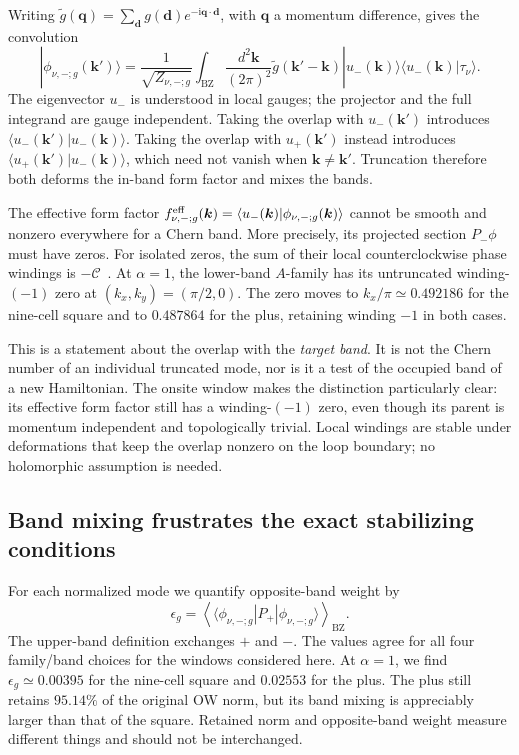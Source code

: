 \documentclass[aps,prb,onecolumn,nofootinbib,superscriptaddress]{revtex4-2}
\newcommand{\bk}{\boldsymbol{k}}
\newcommand{\bd}{\boldsymbol{d}}
\newcommand{\bq}{\boldsymbol{q}}
\newcommand{\ii}{\mathrm{i}}
\newcommand{\BZ}{\mathrm{BZ}}
\newcommand{\Chern}{\mathcal{C}}
\newcommand{\avg}[1]{\left\langle #1\right\rangle_{\BZ}}
\begin{document}
Writing $\widetilde g(\bq)=\sum_{\bd}g(\bd)e^{-\ii\bq\cdot\bd}$, with $\bq$ a momentum difference, gives the convolution
\begin{equation}
 |\phi_{\nu,-;g}(\bk')\rangle
 =\frac{1}{\sqrt{Z_{\nu,-;g}}}\int_{\BZ}\frac{d^2\bk}{(2\pi)^2}
 \widetilde g(\bk'-\bk)|u_-(\bk)\rangle\langle u_-(\bk)|\tau_\nu\rangle.
 \label{eq:convolution}
\end{equation}
The eigenvector $u_-$ is understood in local gauges; the projector and the full integrand are gauge independent. Taking the overlap with $u_-(\bk')$ introduces $\langle u_-(\bk')|u_-(\bk)\rangle$. Taking the overlap with $u_+(\bk')$ instead introduces $\langle u_+(\bk')|u_-(\bk)\rangle$, which need not vanish when $\bk\ne\bk'$. Truncation therefore both deforms the in-band form factor and mixes the bands.

The effective form factor $f^{\rm eff}_{\nu,-;g}(\bk)=\langle u_-(\bk)|\phi_{\nu,-;g}(\bk)\rangle$ cannot be smooth and nonzero everywhere for a Chern band. More precisely, its projected section $P_-\phi$ must have zeros. For isolated zeros, the sum of their local counterclockwise phase windings is $-\Chern$~\cite{BPJ}. At $\alpha=1$, the lower-band $A$-family has its untruncated winding-$(-1)$ zero at $(k_x,k_y)=(\pi/2,0)$. The zero moves to $k_x/\pi\simeq0.492186$ for the nine-cell square and to $0.487864$ for the plus, retaining winding $-1$ in both cases.

This is a statement about the overlap with the \emph{target band}. It is not the Chern number of an individual truncated mode, nor is it a test of the occupied band of a new Hamiltonian. The onsite window makes the distinction particularly clear: its effective form factor still has a winding-$(-1)$ zero, even though its parent is momentum independent and topologically trivial. Local windings are stable under deformations that keep the overlap nonzero on the loop boundary; no holomorphic assumption is needed.

\subsection{Band mixing frustrates the exact stabilizing conditions}

For each normalized mode we quantify opposite-band weight by
\begin{equation}
 \epsilon_g=\avg{\langle\phi_{\nu,-;g}|P_+|\phi_{\nu,-;g}\rangle}.
 \label{eq:leakage}
\end{equation}
The upper-band definition exchanges $+$ and $-$. The values agree for all four family/band choices for the windows considered here. At $\alpha=1$, we find $\epsilon_g\simeq0.00395$ for the nine-cell square and $0.02553$ for the plus. The plus still retains $95.14\%$ of the original OW norm, but its band mixing is appreciably larger than that of the square. Retained norm and opposite-band weight measure different things and should not be interchanged.
\end{document}
